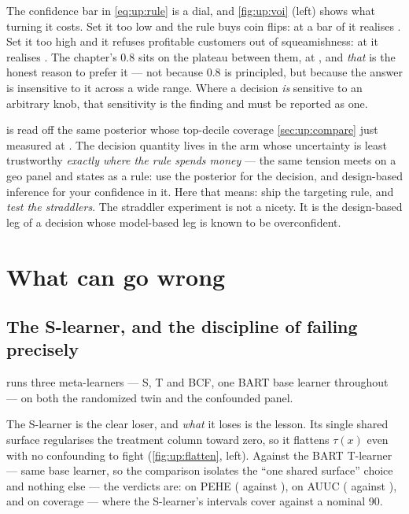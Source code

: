 The confidence bar in \cref{eq:up:rule} is a dial, and \cref{fig:up:voi} (left) shows what turning
it costs. Set it too low and the rule buys coin flips: at a bar of \nbOneConfThrLoose{} it realises
\eur{\nbOneConfProfitLoose}. Set it too high and it refuses profitable customers out of
squeamishness: at \nbOneConfThrStrict{} it realises \eur{\nbOneConfProfitStrict}. The chapter's
$0.8$ sits on the plateau between them, at \eur{\nbOneModelProfit}, and \emph{that} is the honest
reason to prefer it --- not because $0.8$ is principled, but because the answer is insensitive to
it across a wide range. Where a decision \emph{is} sensitive to an arbitrary knob, that
sensitivity is the finding and must be reported as one.

\begin{remark}
 is read off the same posterior whose top-decile coverage
\cref{sec:up:compare} just measured at \pc{\nbOneBcfTopDec}. The decision quantity lives in the arm
whose uncertainty is least trustworthy \emph{exactly where the rule spends money} --- the same
tension  meets on a geo panel and states as a rule: use the posterior for the
decision, and design-based inference for your confidence in it. Here that means: ship the
targeting rule, and \emph{test the straddlers}. The straddler experiment is not a nicety. It is
the design-based leg of a decision whose model-based leg is known to be overconfident.
\end{remark}

\section{What can go wrong}
\label{sec:up:wrong}

\subsection*{The S-learner, and the discipline of failing precisely}

 runs three meta-learners --- S, T and BCF, one BART base learner throughout
--- on both the randomized twin and the confounded panel.



The S-learner is the clear loser, and \emph{what} it loses is the lesson. Its single shared surface
regularises the treatment column toward zero, so it flattens $\tau(x)$ even with no confounding to
fight (\cref{fig:up:flatten}, left). Against the BART T-learner --- same base learner, so the
comparison isolates the ``one shared surface'' choice and nothing else --- the verdicts are:
\textbf{\nbOneSflatPeheWin} on PEHE (\nbOneSflatPeheA{} against \nbOneSflatPeheB),
\textbf{\nbOneSflatAuucWin} on AUUC (\nbOneSflatAuucA{} against \nbOneSflatAuucB), and
\textbf{\nbOneSflatCovWin} on coverage --- where the S-learner's intervals cover
\pc{\nbOneSlCov} against a nominal 90.

